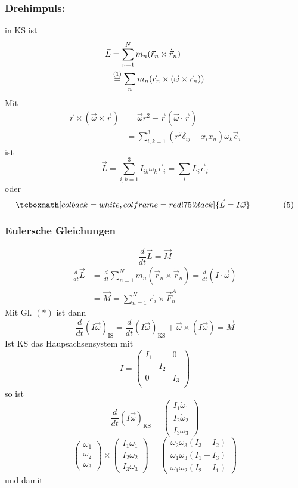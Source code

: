 \documentclass[titlepage,12pt,a4paper,ngerman]{report}
\newcommand{\tx}[1]{\textrm{#1}}
\newcommand{\rmbox}[1]{\tcboxmath[colback=white,colframe=red!75!black]{#1}} %
\begin{document}
{\subsubsection{Drehimpuls:}
in KS ist
\begin{align*}
\vec{L} &= \sum_{n=1}^{N} m_n (\vec{r}_n \times \dot{\vec{r}}_n)\\
&\buildrel (1) \over = \sum_n m_n (\vec{r}_n \times (\vec{\omega} \times \vec{r}_n))
\end{align*}
Mit
\begin{align*}
\vec{r} \times (\vec{\omega} \times \vec{r}) &= \vec{\omega}r^2 - \vec{r} ( \vec{\omega}\cdot \vec{r})\\
&= \sum_{i,k=1}^{3} (r^2 \delta_{ij} - x_i x_n) \omega_k \vec{e}_i
\end{align*}
ist 
$$ \vec{L} = \sum_{i,k = 1}^{3} I_{ik} \omega_k \vec{e}_i = \sum_i L_i \vec{e}_i$$
oder 
\begin{equation*}
\rmbox{\vec{L} = I \vec{\omega}} \qquad \tag{5} 
\end{equation*}
\subsubsection{Eulersche Gleichungen}
$$ \frac{d}{dt} \vec{L} = \vec{M}$$
\begin{align*}
\frac{d}{dt} \vec{L} &= \frac{d}{dt} \sum_{n=1}^N m_n (\vec{r}_n \times \dot \vec{r}_n) = \frac{d}{dt} ( I \cdot \vec{\omega})\\
&= \vec{M} = \sum_{n=1}^{N} \vec{r}_i \times \vec{F}_n^A
\end{align*}
Mit Gl. $ (*) $ ist dann
\begin{equation*}
\frac{d}{dt} (I \vec{\omega})_{\tx{IS}} = \frac{d}{dt} (I \vec{\omega})_{\tx{KS}} + \vec{\omega} \times (I \vec{\omega}) = \vec{M} \tag{6}
\end{equation*}
Ist KS das Haupsachsensystem mit 
$$ I = \begin{pmatrix}
I_1 & & 0 \\
& I_2 & \\
0 & & I_3\\
\end{pmatrix}$$
so ist 
$$ \frac{d}{dt} (I \vec{\omega})_{\tx{KS}} = \begin{pmatrix}
I_1 \dot{\omega}_1\\
I_2 \dot{\omega}_2\\
I_3 \dot{\omega}_3
\end{pmatrix}$$
$$ \begin{pmatrix}
\omega_1\\ \omega_2 \\ \omega_3
\end{pmatrix} \times \begin{pmatrix}
I_1 \omega_1\\ I_2 \omega_2 \\ I_3 \omega_3
\end{pmatrix} = \begin{pmatrix}
\omega_2 \omega_3 (I_3-I_2)\\
\omega_1 \omega_3 (I_1-I_3)\\
\omega_1 \omega_2 (I_2-I_1)
\end{pmatrix}$$
und damit\\ 

}
\end{document}
